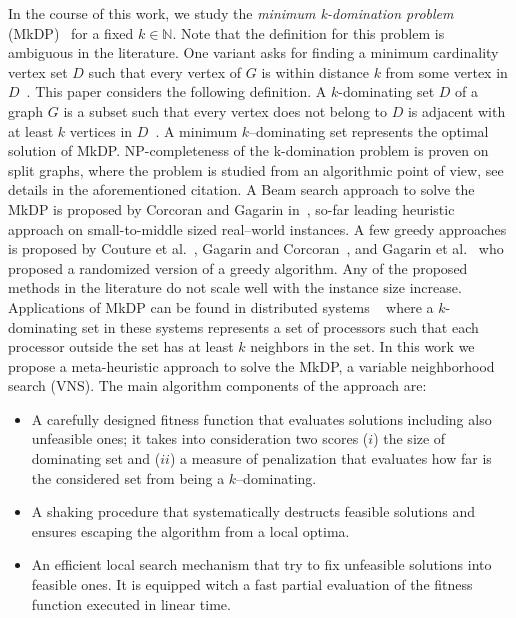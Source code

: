 \documentclass[dvipsnames,format=sigconf,anonymous=true,review=true]{acmart}
\begin{document}
In the course of this work, we study the \emph{minimum k-domination problem} (MkDP)~\cite{corcoran2021heuristics} for a fixed $k \in \mathbb{N}$.  Note that the definition for this problem is ambiguous in the literature. One variant asks for finding a minimum cardinality vertex set $ D$ such that every vertex of $G$ is within distance $k$ from some vertex in $D$~\cite{chang1983k}. 
This paper considers the following definition.  A $k$-dominating set  $D$ of a graph $G$ is a subset such that every vertex does not belong to $D$ is adjacent with at least $k$ vertices in  $D$~\cite{lan2013algorithmic}. A minimum $k$--dominating set represents the optimal solution of MkDP.  NP-completeness of the k-domination problem is proven on split graphs, where the problem is studied from an algorithmic point of view, see details in the aforementioned citation. A Beam search approach to solve the MkDP is proposed by Corcoran and Gagarin   in~\cite{corcoran2021heuristics}, so-far leading heuristic approach on small-to-middle sized real--world instances. A few greedy approaches is proposed by Couture et al.~\cite{couture2006incremental}, Gagarin and Corcoran~\cite{gagarin2018multiple}, and  Gagarin et al.~\cite{gagarin2013randomized} who proposed a randomized version of a greedy algorithm. Any of the proposed methods in the literature do not scale well with the instance size increase.   
Applications of MkDP can be found in  distributed systems  ~\cite{wang2013minimising} where  a $k$-dominating set in these systems represents a set of processors such that each processor outside the set has at least $k$ neighbors in the set.
In this work we propose a meta-heuristic approach to solve the MkDP, a variable neighborhood search (VNS). The main algorithm components of the approach are:
\begin{itemize}
	\item A carefully designed fitness function that evaluates solutions  including also unfeasible ones; it takes into consideration two scores ($i$) the size of dominating set and ($ii$) a measure of penalization that evaluates how far is the considered set from being a $k$--dominating. 
	\item A shaking procedure that systematically destructs feasible solutions and ensures escaping the algorithm from a local optima.
	\item An efficient local search mechanism that try to fix unfeasible solutions into feasible ones. It is equipped witch a fast partial evaluation of the fitness function executed in linear time.
 
\end{itemize}
\end{document}
